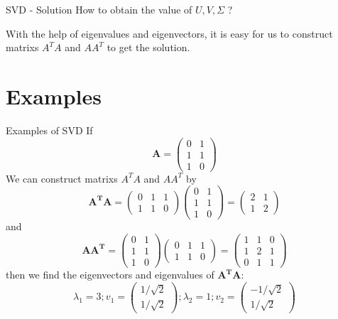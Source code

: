 \documentclass[10pt]{beamer}
\begin{document}
\begin{frame}[fragile]{SVD - Solution}
  How to obtain the value of $U, V, \Sigma$ ?

  With the help of eigenvalues and eigenvectors, it is easy for us to construct matrixs $A^{T}A$ and $AA^{T}$ to get the solution.
\end{frame}

\section{Examples}

\begin{frame}[fragile]{Examples of SVD}
  If $$\mathbf{A} = \left( \begin{array}{ccc} 0& 1\\  1& 1\\   1& 0 \end{array} \right)$$
  We can construct matrixs $A^{T}A$ and $AA^{T}$ by $$\mathbf{A^TA} = \left( \begin{array}{ccc} 0& 1 &1\\ 1&1& 0 \end{array} \right) \left( \begin{array}{ccc} 0& 1\\  1& 1\\   1& 0 \end{array} \right) = \left( \begin{array}{ccc} 2& 1 \\ 1& 2 \end{array} \right)$$
  and $$\mathbf{AA^T} =  \left( \begin{array}{ccc} 0& 1\\  1& 1\\   1& 0 \end{array} \right) \left( \begin{array}{ccc} 0& 1 &1\\ 1&1& 0 \end{array} \right) = \left( \begin{array}{ccc} 1& 1 & 0\\ 1& 2 & 1\\ 0& 1& 1 \end{array} \right)$$
  then we find the eigenvectors and eigenvalues of $\mathbf{A^TA}$:
  $$\lambda_1= 3; v_1 = \left( \begin{array}{ccc} 1/\sqrt{2} \\ 1/\sqrt{2} \end{array} \right); \lambda_2= 1; v_2 = \left( \begin{array}{ccc} -1/\sqrt{2} \\ 1/\sqrt{2} \end{array} \right)$$
\end{frame}
\end{document}

